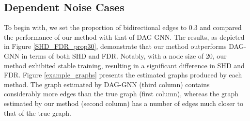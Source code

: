 \documentclass[10pt]{article}
\begin{document}
\subsection{Dependent Noise Cases}

To begin with, we set the proportion of bidirectional edges to 0.3 and compared the performance of our method with that of DAG-GNN. The results, as depicted in Figure \ref*{SHD_FDR_prop30}, demonstrate that our method outperforms DAG-GNN in terms of both SHD and FDR. Notably, with a node size of 20, our method exhibited stable training, resulting in a significant difference in SHD and FDR. Figure \ref*{example_graphs} presents the estimated graphs produced by each method. The graph estimated by DAG-GNN (third column) contains considerably more edges than the true graph (first column), whereas the graph estimated by our method (second column) has a number of edges much closer to that of the true graph.\\
\end{document}
